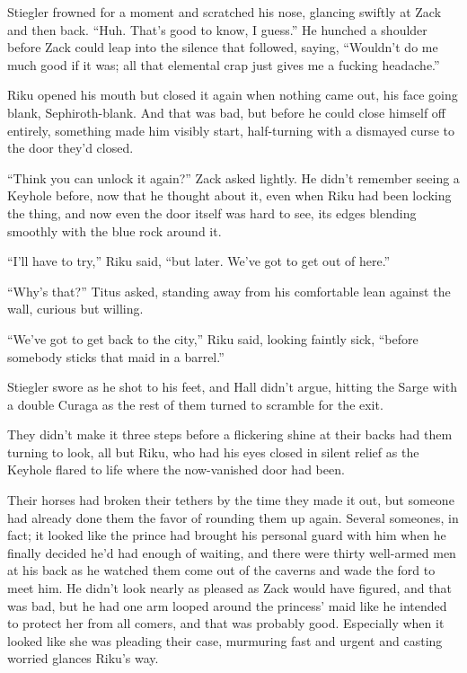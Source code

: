 Stiegler frowned for a moment and scratched his nose, glancing swiftly at Zack and then back. ``Huh. That's good to know, I guess.'' He hunched a shoulder before Zack could leap into the silence that followed, saying, ``Wouldn't do me much good if it was; all that elemental crap just gives me a fucking headache.''

Riku opened his mouth but closed it again when nothing came out, his face going blank, Sephiroth-blank. And that was bad, but before he could close himself off entirely, something made him visibly start, half-turning with a dismayed curse to the door they'd closed.

``Think you can unlock it again?'' Zack asked lightly. He didn't remember seeing a Keyhole before, now that he thought about it, even when Riku had been locking the thing, and now even the door itself was hard to see, its edges blending smoothly with the blue rock around it.

``I'll have to try,'' Riku said, ``but later. We've got to get out of here.''

``Why's that?'' Titus asked, standing away from his comfortable lean against the wall, curious but willing.

``We've got to get back to the city,'' Riku said, looking faintly sick, ``before somebody sticks that maid in a barrel.''

Stiegler swore as he shot to his feet, and Hall didn't argue, hitting the Sarge with a double Curaga as the rest of them turned to scramble for the exit.

They didn't make it three steps before a flickering shine at their backs had them turning to look, all but Riku, who had his eyes closed in silent relief as the Keyhole flared to life where the now-vanished door had been.

Their horses had broken their tethers by the time they made it out, but someone had already done them the favor of rounding them up again. Several someones, in fact; it looked like the prince had brought his personal guard with him when he finally decided he'd had enough of waiting, and there were thirty well-armed men at his back as he watched them come out of the caverns and wade the ford to meet him. He didn't look nearly as pleased as Zack would have figured, and that was bad, but he had one arm looped around the princess' maid like he intended to protect her from all comers, and that was probably good. Especially when it looked like she was pleading their case, murmuring fast and urgent and casting worried glances Riku's way.

